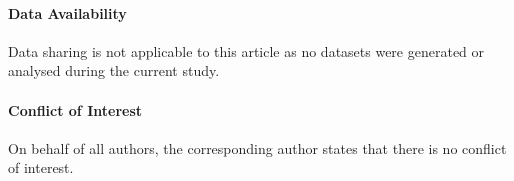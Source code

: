 \documentclass[letter, 11pt]{article}
\theoremstyle{plain}
\theoremstyle{definition}
\newcommand{\<}{\langle}
\renewcommand{\>}{\rangle}
\begin{document}

\paragraph{Data Availability} Data sharing is not applicable to this article as no datasets were generated or analysed during the current study. 


\paragraph{Conflict of Interest} On behalf of all authors, the corresponding author states that there is no conflict of interest. 

\printbibliography
\end{document}
